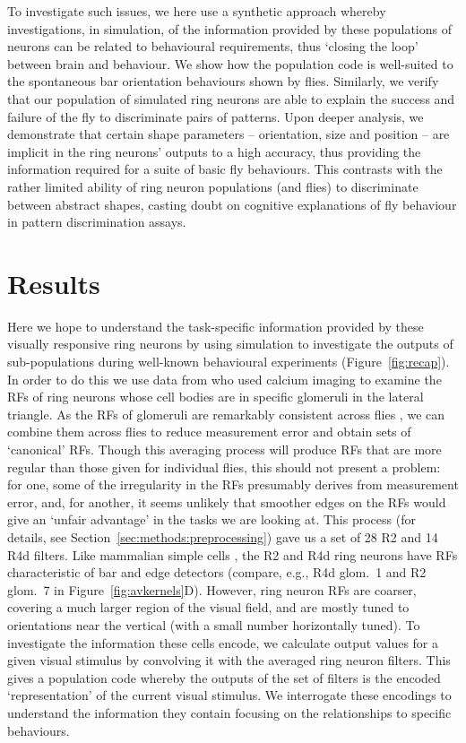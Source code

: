 \documentclass[10pt]{article}
\begin{document}
To investigate such issues, we here use a synthetic approach whereby investigations, in simulation, of the information provided by these populations of neurons can be related to behavioural requirements, thus `closing the loop' between brain and behaviour. We show how the population code is well-suited to the spontaneous bar orientation behaviours shown by flies. Similarly, we verify that our population of simulated ring neurons are able to explain the success and failure of the fly to discriminate pairs of patterns. Upon deeper analysis, we demonstrate that certain shape parameters -- orientation, size and position -- are implicit in the ring neurons' outputs to a high accuracy, thus providing the information required for a suite of basic fly behaviours. This contrasts with the rather limited ability of ring neuron populations (and flies) to discriminate between abstract shapes, casting doubt on cognitive explanations of fly behaviour in pattern discrimination assays.

\section{Results}
Here we hope to understand the task-specific information provided by these visually responsive ring neurons by using simulation to investigate the outputs of sub-populations during well-known behavioural experiments (Figure~\ref{fig:recap}). In order to do this we use data from \cite{Seelig2013} who used calcium imaging to examine the \acp{RF} of ring neurons whose cell bodies are in specific glomeruli in the lateral triangle. As the RFs of glomeruli are remarkably consistent across flies \cite{Seelig2013}, we can combine them across flies to reduce measurement error and obtain sets of `canonical' RFs. Though this averaging process will produce \acp{RF} that are more regular than those given for individual flies, this should not present a problem: for one, some of the irregularity in the \acp{RF} presumably derives from measurement error, and, for another, it seems unlikely that smoother edges on the \acp{RF} would give an `unfair advantage' in the tasks we are looking at. This process (for details, see Section~\ref{sec:methods:preprocessing}) gave us a set of 28 R2 and 14 R4d filters. Like mammalian simple cells \cite{Hubel1962,Wystrach2014}, the R2 and R4d ring neurons have RFs characteristic of bar and edge detectors (compare, e.g., R4d glom.~1 and R2 glom.~7 in Figure~\ref{fig:avkernels}D).
However, ring neuron RFs are coarser, covering a much larger region of the visual field, and are mostly tuned to orientations near the vertical (with a small number horizontally tuned). To investigate the information these cells encode, we calculate output values for a given visual stimulus by convolving it with the averaged ring neuron filters. This gives a population code whereby the outputs of the set of filters is the encoded `representation' of the current visual stimulus. We interrogate these encodings to understand the information they contain focusing on the relationships to specific behaviours.
\end{document}
